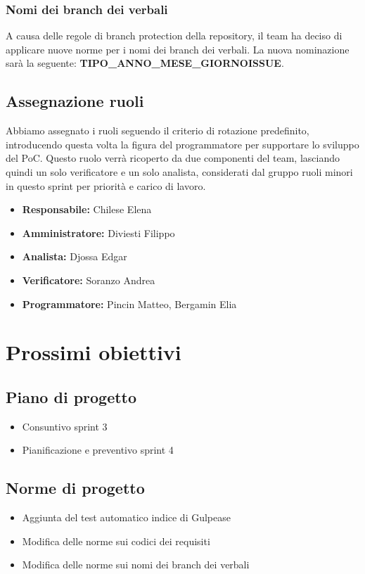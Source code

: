 \subsubsection{Nomi dei branch dei verbali}
A causa delle regole di branch protection della repository, il team ha deciso di applicare nuove norme per i nomi dei branch dei verbali.
La nuova nominazione sarà la seguente: \textbf{TIPO\_ANNO\_MESE\_GIORNO\-ISSUE}.

\subsection{Assegnazione ruoli}
Abbiamo assegnato i ruoli seguendo il criterio di rotazione predefinito, introducendo questa volta la figura del programmatore per supportare lo sviluppo del PoC.
Questo ruolo verrà ricoperto da due componenti del team, lasciando quindi un solo verificatore e un solo analista, considerati dal gruppo ruoli minori in questo sprint per priorità e carico di lavoro.
\begin{itemize}
    \item \textbf{Responsabile:} Chilese Elena
    \item \textbf{Amministratore:} Diviesti Filippo
    \item \textbf{Analista:} Djossa Edgar
    \item \textbf{Verificatore:} Soranzo Andrea
    \item \textbf{Programmatore:} Pincin Matteo, Bergamin Elia
\end{itemize}

\section{Prossimi obiettivi}

\subsection{Piano di progetto}
\begin{itemize}
    \item Consuntivo sprint 3
    \item Pianificazione e preventivo sprint 4
\end{itemize}

\subsection{Norme di progetto}
\begin{itemize}
    \item Aggiunta del test automatico indice di Gulpease
    \item Modifica delle norme sui codici dei requisiti
    \item Modifica delle norme sui nomi dei branch dei verbali
\end{itemize}

